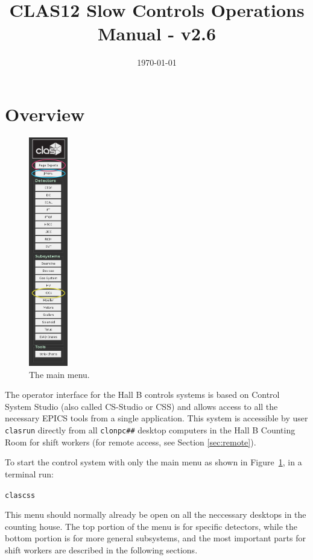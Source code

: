 \documentclass[amsmath,amssymb,notitlepage,11pt]{revtex4}
\begin{document}
\title{CLAS12 Slow Controls Operations Manual - v2.6}
\date{\today}
\begin{abstract}
\end{abstract}

\maketitle
\tableofcontents
\newpage

\section{Overview}

\begin{figure}\centering\vspace{1cm}
  \includegraphics[width=0.15\textwidth]{pics/mainmenu}
  \caption{The main menu.\label{fig:mainmenu}}
\end{figure}

The operator interface for the Hall B controls systems is based on Control System Studio (also called CS-Studio or CSS) and allows access to all the necessary EPICS tools from a single application.  This system is accessible by user \texttt{clasrun} directly from all \texttt{clonpc\#\#} desktop computers in the Hall B Counting Room for shift workers (for remote access, see Section \ref{sec:remote}).


To start the control system with only the main menu as shown in Figure~\ref{fig:mainmenu}, in a terminal run: \begin{center}\texttt{clascss}\end{center}  This menu should normally already be open on all the neccessary desktops in the counting house.  The top portion of the menu is for specific detectors, while the bottom portion is for more general subsystems, and the most important parts for shift workers are described in the following sections.
\end{document}
